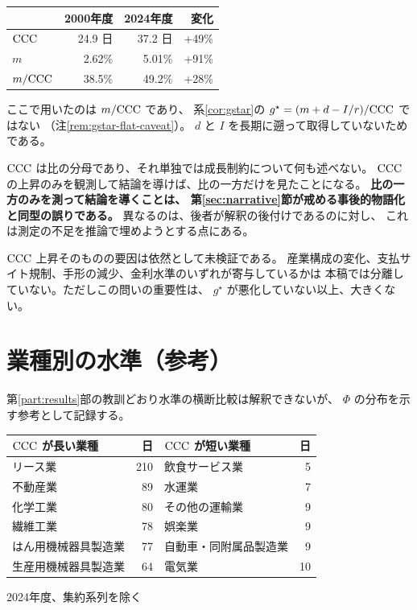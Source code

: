 \begin{center}
\begin{tabular}{@{}lrrr@{}}
\toprule
 & 2000年度 & 2024年度 & 変化 \\
\midrule
$\mathrm{CCC}$ & 24.9 日 & 37.2 日 & +49\% \\
$m$ & 2.62\% & 5.01\% & +91\% \\
$m/\mathrm{CCC}$ & 38.5\% & 49.2\% & +28\% \\
\bottomrule
\end{tabular}
\label{tab:ccc-m-ratio-2000-2024}
\end{center}

ここで用いたのは $m/\mathrm{CCC}$ であり、
系\ref{cor:gstar}の $g^\star=(m+d-I/r)/\mathrm{CCC}$ ではない
（注\ref{rem:gstar-flat-caveat}）。
$d$ と $I$ を長期に遡って取得していないためである。

\begin{remark}[比を扱う際の規律]
$\mathrm{CCC}$ は比の分母であり、それ単独では成長制約について何も述べない。
$\mathrm{CCC}$ の上昇のみを観測して結論を導けば、比の一方だけを見たことになる。
\textbf{比の一方のみを測って結論を導くことは、
第\ref{sec:narrative}節が戒める事後的物語化と同型の誤りである。}
異なるのは、後者が解釈の後付けであるのに対し、
これは測定の不足を推論で埋めようとする点にある。
\end{remark}

$\mathrm{CCC}$ 上昇そのものの要因は依然として未検証である。
産業構成の変化、支払サイト規制、手形の減少、金利水準のいずれが寄与しているかは
本稿では分離していない。ただしこの問いの重要性は、
$g^\star$ が悪化していない以上、大きくない。

\section{業種別の水準（参考）}
\label{sec:ccc-extremes-by-industry}

第\ref{part:results}部の教訓どおり水準の横断比較は解釈できないが、
$\Phi$ の分布を示す参考として記録する。

\begin{center}
\begin{tabular}{@{}lrlr@{}}
\toprule
$\mathrm{CCC}$ が長い業種 & 日 & $\mathrm{CCC}$ が短い業種 & 日 \\
\midrule
リース業 & 210 & 飲食サービス業 & 5 \\
不動産業 & 89 & 水運業 & 7 \\
化学工業 & 80 & その他の運輸業 & 9 \\
繊維工業 & 78 & 娯楽業 & 9 \\
はん用機械器具製造業 & 77 & 自動車・同附属品製造業 & 9 \\
生産用機械器具製造業 & 64 & 電気業 & 10 \\
\bottomrule
\end{tabular}
\label{tab:ccc-extremes-by-industry}
\end{center}
\begin{center}\footnotesize 2024年度、集約系列を除く\end{center}


